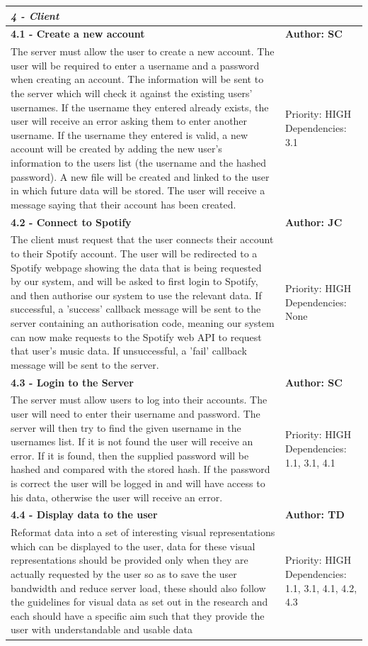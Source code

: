 \documentclass[11pt]{report}
\begin{document}
\begin{center}
\begin{longtable}{| p{13cm} | p{3cm} |}
\hline
\multicolumn{2}{|l|}{\textbf{\textit{4 - Client}}} \\
\hline
\textbf{4.1 - Create a new account} & \textbf{Author: SC} \\
\hline
The server must allow the user to create a new account. The user will be required to enter a username and a password when creating an account. The information will be sent to the server which will check it against the existing users’ usernames. If the username they entered already exists, the user will receive an error asking them to enter another username. If the username they entered is valid, a new account will be created by adding the new user’s information to the users list (the username and the hashed password). A new file will be created and linked to the user in which future data will be stored. The user will receive a message saying that their account has been created. & Priority: HIGH Dependencies: 3.1 \\
\hline
\textbf{4.2 - Connect to Spotify} & \textbf{Author: JC} \\
\hline
The client must request that the user connects their account to their Spotify account. The user will be redirected to a Spotify webpage showing the data that is being requested by our system, and will be asked to first login to Spotify, and then authorise our system to use the relevant data. If successful, a 'success' callback message will be sent to the server containing an authorisation code, meaning our system can now make requests to the Spotify web API to request that user's music data. If unsuccessful, a 'fail' callback message will be sent to the server. & Priority: HIGH Dependencies: None \\
\hline
\textbf{4.3 - Login to the Server} & \textbf{Author: SC} \\
\hline
The server must allow users to log into their accounts. The user will need to enter their username and password. The server will then try to find the given username in the usernames list. If it is not found the user will receive an error. If it is found, then the supplied password will be hashed and compared with the stored hash. If the password is correct the user will be logged in and will have access to his data, otherwise the user will receive an error. &  Priority: HIGH Dependencies: 1.1, 3.1, 4.1 \\
\hline
\textbf{4.4 - Display data to the user} & \textbf{Author: TD} \\
\hline
Reformat data into a set of interesting visual representations which can be displayed to the user, data for these visual representations should be provided only when they are actually requested by the user so as to save the user bandwidth and reduce server load, these should also follow the guidelines for visual data as set out in the research and each should have a specific aim such that they provide the user with understandable and usable data &  Priority: HIGH Dependencies: 1.1, 3.1, 4.1, 4.2, 4.3 \\

\end{longtable}
\end{center}
\end{document}
